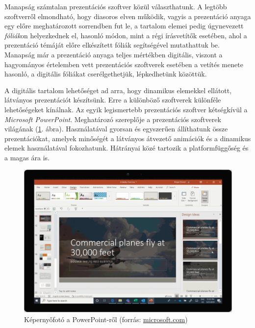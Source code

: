 

Manapság számtalan prezentációs szoftver közül választhatunk. A legtöbb szoftverről elmondható, hogy diasoros elven működik, vagyis a prezentáció anyaga egy előre meghatározott sorrendben fut le, a tartalom elemei pedig úgynevezett \textit{fóliák}on helyezkednek el, hasonló módon, mint a régi írásvetítők esetében, ahol a prezentáció témáját előre elkészített fóliák segítségével mutathattuk be. Manapság már a prezentáció anyaga teljes mértékben digitális, viszont a hagyományos értelemben vett prezentációs szoftverek esetében a vetítés menete hasonló, a digitális fóliákat cserélgethetjük, lépkedhetünk közöttük.

A digitális tartalom lehetőséget ad arra, hogy dinamikus elemekkel ellátott, látványos prezentációt készítsünk. Erre a különböző szoftverek különféle lehetőségeket kínálnak.
Az egyik legismertebb prezentációs szoftver kétségkívül a \textit{Microsoft PowerPoint}. Meghatározó szereplője a prezentációs szoftverek világának (\ref{fig:ppt}. ábra). Használatával gyorsan és egyszerűen állíthatunk össze prezentációkat, amelyek minőségét a látványos átvezető animációk és a dinamikus elemek használatával fokozhatunk. Hátrányai közé tartozik a platformfüggőség és a magas ára is.

\begin{figure}[h]
\centering
\includegraphics[width=\textwidth]{images/PowerPoint.png}
\caption{Képernyőfotó a PowerPoint-ről (forrás: \url{microsoft.com})}
\label{fig:ppt}
\end{figure}

